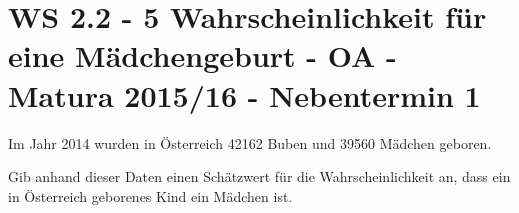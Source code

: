 \section{WS 2.2 - 5 Wahrscheinlichkeit für eine Mädchengeburt - OA - Matura
2015/16 - Nebentermin 1}

\begin{beispiel}{1} %
	Im Jahr 2014 wurden in Österreich 42162 Buben und 39560 Mädchen geboren. \leer
	
	Gib anhand dieser Daten einen Schätzwert für die Wahrscheinlichkeit an, dass ein in Österreich geborenes Kind ein Mädchen ist. 

	
\end{beispiel}